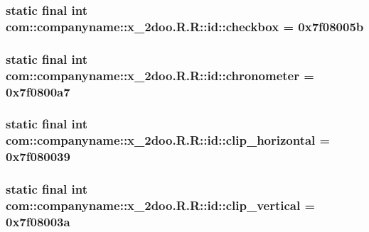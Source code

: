 \hypertarget{classcom_1_1companyname_1_1x__2doo_1_1_r_1_1id_a9b5a3b2090b215df17c80ed5acc2736}{
\subsubsection[{checkbox}]{\setlength{\rightskip}{0pt plus 5cm}static final int com::companyname::x\_\-2doo.R.R::id::checkbox = 0x7f08005b}}
\label{classcom_1_1companyname_1_1x__2doo_1_1_r_1_1id_a9b5a3b2090b215df17c80ed5acc2736}


\hypertarget{classcom_1_1companyname_1_1x__2doo_1_1_r_1_1id_50638ec4704b8b96cd401c529c8975fe}{
\subsubsection[{chronometer}]{\setlength{\rightskip}{0pt plus 5cm}static final int com::companyname::x\_\-2doo.R.R::id::chronometer = 0x7f0800a7}}
\label{classcom_1_1companyname_1_1x__2doo_1_1_r_1_1id_50638ec4704b8b96cd401c529c8975fe}


\hypertarget{classcom_1_1companyname_1_1x__2doo_1_1_r_1_1id_e98cd69269fbb0b269f2540d143e85ff}{
\subsubsection[{clip\_\-horizontal}]{\setlength{\rightskip}{0pt plus 5cm}static final int com::companyname::x\_\-2doo.R.R::id::clip\_\-horizontal = 0x7f080039}}
\label{classcom_1_1companyname_1_1x__2doo_1_1_r_1_1id_e98cd69269fbb0b269f2540d143e85ff}


\hypertarget{classcom_1_1companyname_1_1x__2doo_1_1_r_1_1id_e3b425867fcefc09b343feb07346857f}{
\subsubsection[{clip\_\-vertical}]{\setlength{\rightskip}{0pt plus 5cm}static final int com::companyname::x\_\-2doo.R.R::id::clip\_\-vertical = 0x7f08003a}}
\label{classcom_1_1companyname_1_1x__2doo_1_1_r_1_1id_e3b425867fcefc09b343feb07346857f}


